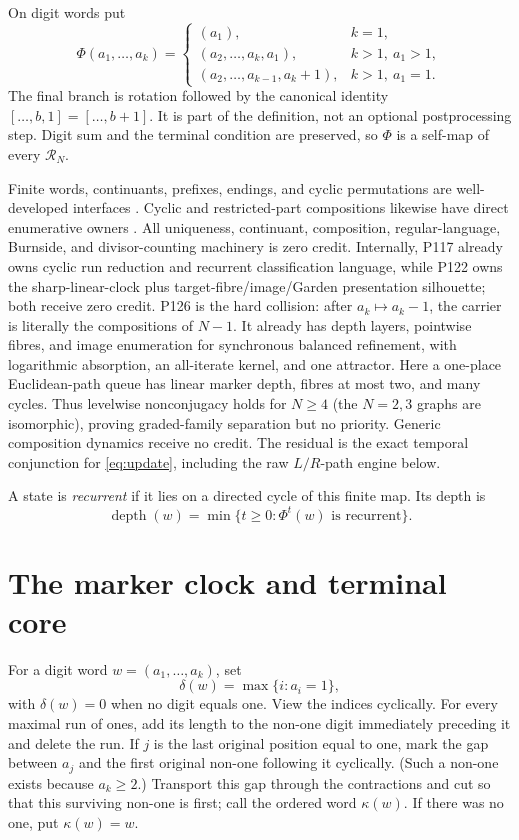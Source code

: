 \documentclass[10pt,a4paper]{amsart}
\theoremstyle{definition}
\theoremstyle{remark}
\newcommand{\R}{\mathcal R}
\newcommand{\depth}{\operatorname{depth}}
\begin{document}
On digit words put
\begin{equation}
 \Phi(a_1,\ldots,a_k)=
 \begin{cases}
 (a_1),&k=1,\\
 (a_2,\ldots,a_k,a_1),&k>1,\ a_1>1,\\
 (a_2,\ldots,a_{k-1},a_k+1),&k>1,\ a_1=1.
 \end{cases}                                           \label{eq:update}
\end{equation}
The final branch is rotation followed by the canonical identity
$[\ldots,b,1]=[\ldots,b+1]$.  It is part of the definition, not an optional
postprocessing step.  Digit sum and the terminal condition are preserved, so
$\Phi$ is a self-map of every $\R_N$.

Finite words, continuants, prefixes, endings, and cyclic permutations are
well-developed interfaces \cite{Kan2026,Jones2026}.  Cyclic and
restricted-part compositions likewise have direct enumerative owners
\cite{GibsonJustWang2018,Hadjicostas2016}.  All uniqueness, continuant,
composition, regular-language, Burnside, and divisor-counting machinery is
zero credit.  Internally, P117 already owns cyclic run reduction and recurrent
classification language, while P122 owns the sharp-linear-clock plus
target-fibre/image/Garden presentation silhouette; both receive zero credit.
P126 is the hard collision: after $a_k\mapsto a_k-1$, the carrier is literally
the compositions of $N-1$.  It already has depth layers, pointwise fibres,
and image enumeration for synchronous balanced refinement, with logarithmic
absorption, an all-iterate kernel, and one attractor.  Here a one-place
Euclidean-path queue has linear marker depth, fibres at most two, and many
cycles.  Thus levelwise nonconjugacy holds for $N\ge4$ (the $N=2,3$ graphs
are isomorphic), proving graded-family separation but no priority.  Generic
composition dynamics receive no credit.  The residual is the exact temporal
conjunction for \eqref{eq:update}, including the raw $L/R$-path engine below.

A state is \emph{recurrent} if it lies on a directed cycle of this finite
map.  Its depth is
\[
 \depth(w)=\min\{t\ge0:\Phi^t(w)\text{ is recurrent}\}.
\]

\section{The marker clock and terminal core}

For a digit word $w=(a_1,\ldots,a_k)$, set
\[
 \delta(w)=\max\{i:a_i=1\},
\]
with $\delta(w)=0$ when no digit equals one.  View the indices cyclically.
For every maximal run of ones, add its length to the non-one digit immediately
preceding it and delete the run.  If $j$ is the last original position equal
to one, mark the gap between $a_j$ and the first original non-one following
it cyclically.  (Such a non-one exists because $a_k\ge2$.)  Transport this
gap through the contractions and cut so that this surviving non-one is first;
call the ordered word $\kappa(w)$.  If there was no one, put
$\kappa(w)=w$.
\end{document}
